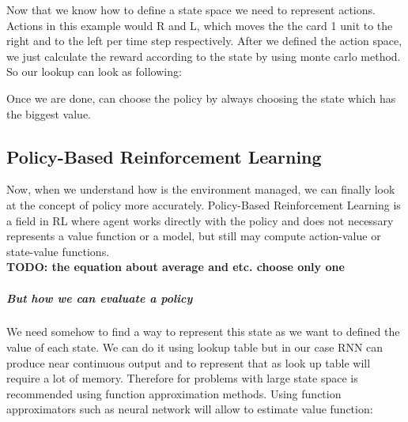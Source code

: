 Now that we know how to define a state space we need to represent actions. Actions
in this example would R and L, which moves the the card 1 unit to the right
and to the left per time step respectively. After we defined the action
space, we just calculate the reward according to the state by using monte carlo method.
So our lookup can look as following:


Once we are done, can choose the policy by always choosing the state which has
the biggest value.
















\subsection{Policy-Based Reinforcement Learning}
Now, when we understand how is the environment managed, we can finally
look at the concept of policy more accurately.
Policy-Based Reinforcement Learning is a field in RL where agent works directly
with the policy and does not necessary represents a value function or a model,
but still may compute action-value or state-value functions.\\

\textbf{TODO: the equation about average and etc. choose only one}
\subparagraph{But how we can evaluate a policy}


We need somehow to find a way to represent this state
as we want to defined the value of each state. We can do it using lookup table
but in our case RNN can produce near continuous output and to represent that
as look up table will require a lot of memory. Therefore for problems with large
state space is recommended using function approximation methods.
Using function approximators such as neural network will allow to estimate value function:

